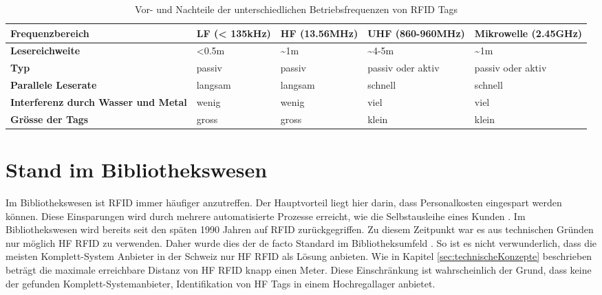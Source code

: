 \begin{table}[htb]
	\begin{tabularx}{\textwidth}{|X|X|X|X|X|}
		\hline
		\textbf{Frequenz\-bereich} & \textbf{LF (< 135kHz)} & \textbf{HF (13.56MHz)} & \textbf{UHF (860-960MHz)} & \textbf{Mikrowelle (2.45GHz)}\\
		\hline
		\textbf{Lesereichweite} & <0.5m & \textasciitilde 1m & \textasciitilde 4-5m & \textasciitilde 1m\\
		\hline
		\textbf{Typ} & passiv & passiv & passiv oder aktiv & passiv oder aktiv\\
		\hline
		\textbf{Parallele Leserate} & langsam & langsam & schnell & schnell \\
		\hline
		\textbf{Interferenz durch Wasser und Metal} & wenig & wenig & viel & viel \\
		\hline
		\textbf{Grösse der Tags} & gross & gross & klein & klein \\
		\hline
	\end{tabularx}
	\caption{Vor- und Nachteile der unterschiedlichen Betriebsfrequenzen von \gls{RFID} Tags \parencite{chawla2007}}
	\label{tbl:RFIDFrequencies}
\end{table}

\section{Stand im Bibliothekswesen}
Im Bibliothekswesen ist \gls{RFID} immer häufiger anzutreffen. Der Hauptvorteil liegt hier darin, dass Personalkosten eingespart werden können. Diese Einsparungen wird durch mehrere automatisierte Prozesse erreicht, wie die Selbstausleihe eines Kunden \parencite{Keller2010}.
Im Bibliothekswesen wird bereits seit den späten 1990 Jahren auf \gls{RFID} zurückgegriffen. Zu diesem Zeitpunkt war es aus technischen Gründen nur möglich HF \gls{RFID} zu verwenden. Daher wurde dies der de facto Standard im Bibliotheksumfeld \parencite{rfidHfVsUhf}. So ist es nicht verwunderlich, dass die meisten Komplett-System Anbieter in der Schweiz nur HF \gls{RFID} als Lösung anbieten. Wie in Kapitel \ref{sec:technischeKonzepte} beschrieben beträgt die maximale erreichbare Distanz von HF \gls{RFID} knapp einen Meter. Diese Einschränkung ist wahrscheinlich der Grund, dass keine der gefunden Komplett-Systemanbieter, Identifikation von HF Tags in einem Hochregallager anbietet.

